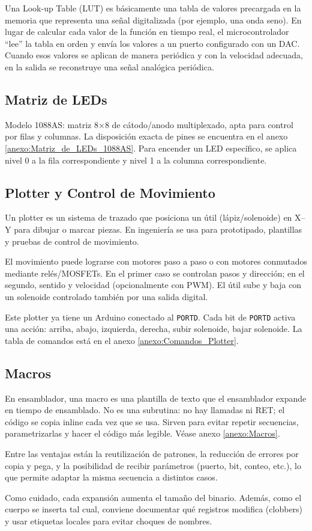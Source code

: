 Una Look-up Table (LUT) es básicamente una tabla de valores precargada en la memoria que representa una señal digitalizada (por ejemplo, una onda seno). En lugar de calcular cada valor de la función en tiempo real, el microcontrolador ``lee'' la tabla en orden y envía los valores a un puerto configurado con un DAC. Cuando esos valores se aplican de manera periódica y con la velocidad adecuada, en la salida se reconstruye una señal analógica periódica.
    

\subsection{Matriz de LEDs}
Modelo 1088AS: matriz 8×8 de cátodo/anodo multiplexado, apta para control por filas y columnas. La disposición exacta de pines se encuentra en el anexo \ref{anexo:Matriz_de_LEDs_1088AS}. Para encender un LED específico, se aplica nivel 0 a la fila correspondiente y nivel 1 a la columna correspondiente.


\subsection{Plotter y Control de Movimiento}
Un plotter es un sistema de trazado que posiciona un útil (lápiz/solenoide) en X–Y para dibujar o marcar piezas. En ingeniería se usa para prototipado, plantillas y pruebas de control de movimiento.

El movimiento puede lograrse con motores paso a paso o con motores conmutados mediante relés/MOSFETs. En el primer caso se controlan pasos y dirección; en el segundo, sentido y velocidad (opcionalmente con PWM). El útil sube y baja con un solenoide controlado también por una salida digital.

Este plotter ya tiene un Arduino conectado al \texttt{PORTD}. Cada bit de \texttt{PORTD} activa una acción: arriba, abajo, izquierda, derecha, subir solenoide, bajar solenoide. La tabla de comandos está en el anexo \ref{anexo:Comandos_Plotter}.


\subsection{Macros}
En ensamblador, una macro es una plantilla de texto que el ensamblador expande en tiempo de ensamblado. No es una subrutina: no hay llamadas ni RET; el código se copia inline cada vez que se usa. Sirven para evitar repetir secuencias, parametrizarlas y hacer el código más legible. Véase anexo \ref{anexo:Macros}.

Entre las ventajas están la reutilización de patrones, la reducción de errores por copia y pega, y la posibilidad de recibir parámetros (puerto, bit, conteo, etc.), lo que permite adaptar la misma secuencia a distintos casos.

Como cuidado, cada expansión aumenta el tamaño del binario. Además, como el cuerpo se inserta tal cual, conviene documentar qué registros modifica (clobbers) y usar etiquetas locales para evitar choques de nombres.



